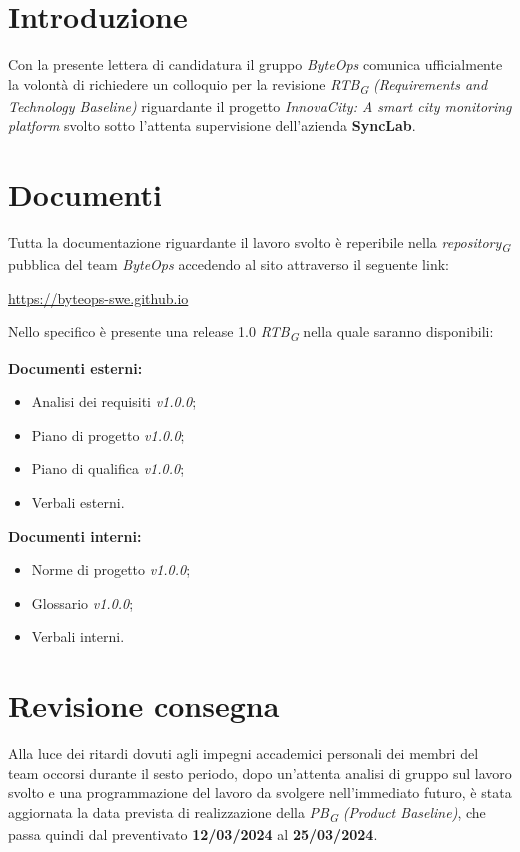 \documentclass{article}
\begin{document}
\section{Introduzione}
Con la presente lettera di candidatura il gruppo \textit{ByteOps} comunica ufficialmente la volontà di richiedere un colloquio per la revisione \textit{RTB}\textsubscript{\textit{G}} \textit{(Requirements and Technology Baseline)} riguardante il progetto \textit{InnovaCity: A smart city monitoring platform} svolto sotto l'attenta supervisione dell'azienda \textbf{SyncLab}.

\section{Documenti}
Tutta la documentazione riguardante il lavoro svolto è reperibile nella \textit{repository}\textsubscript{\textit{G}} pubblica del team \textit{ByteOps} accedendo al sito attraverso il seguente link:

\begin{center}
    \href{https://byteops-swe.github.io}{https://byteops-swe.github.io}
\end{center}

Nello specifico è presente una release 1.0 \textit{RTB}\textsubscript{\textit{G}} nella quale saranno disponibili:
\vspace{0.2cm}

\textbf{Documenti esterni:}
\begin{itemize}
    \item Analisi dei requisiti \textit{v1.0.0};
    \item Piano di progetto \textit{v1.0.0};
    \item Piano di qualifica \textit{v1.0.0};
    \item Verbali esterni.
\end{itemize}
\vspace{0.2cm}

\textbf{Documenti interni:}
\begin{itemize}
    \item Norme di progetto \textit{v1.0.0};
    \item Glossario \textit{v1.0.0};
    \item Verbali interni.
\end{itemize}

\section{Revisione consegna}
Alla luce dei ritardi dovuti agli impegni accademici personali dei membri del team occorsi durante il sesto periodo, dopo un'attenta analisi di gruppo sul lavoro svolto e una programmazione del lavoro da svolgere nell'immediato futuro, è stata aggiornata la data prevista di realizzazione della \textit{PB}\textsubscript{\textit{G}} \textit{(Product Baseline)}, che passa quindi dal preventivato \textbf{12/03/2024} al \textbf{25/03/2024}.
\end{document}
